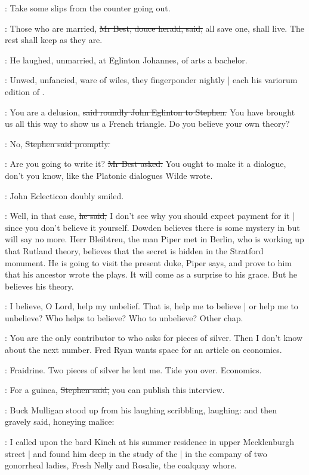 \StephenInt:
Take some slips from the counter going out.

\best:
Those who are married,
\sout{Mr Best, douce herald, said,}
all save one,
shall live.
The rest shall keep as they are.

:
He laughed,
unmarried,
at Eglinton Johannes,
of arts a bachelor.

\StephenInt:
Unwed,
unfancied,
ware of wiles,
they fingerponder nightly |
each his variorum edition of .

\eglinton:
You are a delusion,
\sout{said roundly John Eglinton to Stephen.}
You have brought us all this way to show us a French triangle.
Do you believe your own theory?

\Stephen:
No,
\sout{Stephen said promptly.}

\best:
Are you going to write it?
\sout{Mr Best asked.}
You ought to make it a dialogue,
don't you know,
like the Platonic dialogues Wilde wrote.

:
John Eclecticon doubly smiled.

\eglinton:
Well,
in that case,
\sout{he said,}
I don't see why you should expect payment for it |
since you don't believe it yourself.
Dowden believes there is some mystery in  but will say no more.
Herr Bleibtreu,
the man Piper met in Berlin,
who is working up that Rutland theory,
believes that the secret is hidden in the Stratford monument.
He is going to visit the present duke,
Piper says,
and prove to him that his ancestor wrote the plays.
It will come as a surprise to his grace.
But he believes his theory.

\StephenInt:
I believe,
O Lord, help my unbelief.
That is, help me to believe |
or help me to unbelieve?
Who helps to believe?
Who to unbelieve?
Other chap.%

\eglinton:
You are the only contributor to  who asks for pieces of silver.
Then I don't know about the next number.
Fred Ryan wants space for an article on economics.

\StephenInt:
Fraidrine.
Two pieces of silver he lent me.
Tide you over.
Economics.

\Stephen:
For a guinea,
\sout{Stephen said,}
you can publish this interview.

:
Buck Mulligan stood up from his laughing scribbling,
laughing:
and then gravely said,
honeying malice:

\mulligan:
I called upon the bard Kinch at his summer residence in upper Mecklenburgh street |
and found him deep in the study of the  |
in the company of two gonorrheal ladies,
Fresh Nelly and Rosalie,
the coalquay whore.

